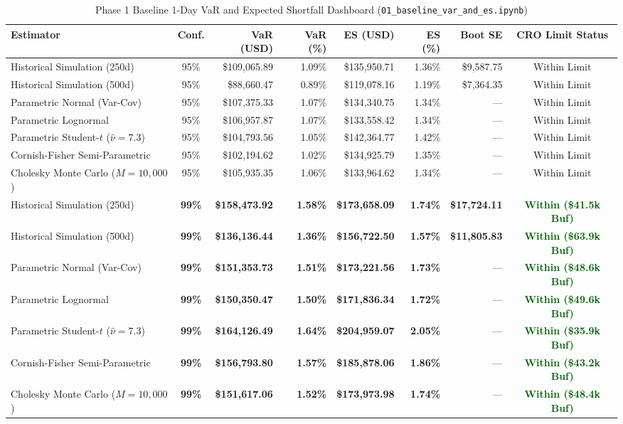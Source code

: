 \documentclass[11pt,a4paper]{article}
\begin{document}
\begin{table}[H]
\centering
\caption{Phase 1 Baseline 1-Day VaR and Expected Shortfall Dashboard (\texttt{01\_baseline\_var\_and\_es.ipynb})}
\footnotesize
\begin{tabular}{lcrrrrrc}
\toprule
\textbf{Estimator} & \textbf{Conf.} & \textbf{VaR (USD)} & \textbf{VaR (\%)} & \textbf{ES (USD)} & \textbf{ES (\%)} & \textbf{Boot SE} & \textbf{CRO Limit Status} \\
\midrule
Historical Simulation (250d) & 95\% & \$109,065.89 & 1.09\% & \$135,950.71 & 1.36\% & \$9,587.75 & Within Limit \\
Historical Simulation (500d) & 95\% & \$88,660.47 & 0.89\% & \$119,078.16 & 1.19\% & \$7,364.35 & Within Limit \\
Parametric Normal (Var-Cov) & 95\% & \$107,375.33 & 1.07\% & \$134,340.75 & 1.34\% & --- & Within Limit \\
Parametric Lognormal & 95\% & \$106,957.87 & 1.07\% & \$133,558.42 & 1.34\% & --- & Within Limit \\
Parametric Student-$t$ ($\hat{\nu}=7.3$) & 95\% & \$104,793.56 & 1.05\% & \$142,364.77 & 1.42\% & --- & Within Limit \\
Cornish-Fisher Semi-Parametric & 95\% & \$102,194.62 & 1.02\% & \$134,925.79 & 1.35\% & --- & Within Limit \\
Cholesky Monte Carlo ($M=10,000$) & 95\% & \$105,935.35 & 1.06\% & \$133,964.62 & 1.34\% & --- & Within Limit \\
\midrule
Historical Simulation (250d) & \textbf{99\%} & \textbf{\$158,473.92} & \textbf{1.58\%} & \textbf{\$173,658.09} & \textbf{1.74\%} & \textbf{\$17,724.11} & \textcolor{darkgreen}{\textbf{Within (\$41.5k Buf)}} \\
Historical Simulation (500d) & \textbf{99\%} & \textbf{\$136,136.44} & \textbf{1.36\%} & \textbf{\$156,722.50} & \textbf{1.57\%} & \textbf{\$11,805.83} & \textcolor{darkgreen}{\textbf{Within (\$63.9k Buf)}} \\
Parametric Normal (Var-Cov) & \textbf{99\%} & \textbf{\$151,353.73} & \textbf{1.51\%} & \textbf{\$173,221.56} & \textbf{1.73\%} & --- & \textcolor{darkgreen}{\textbf{Within (\$48.6k Buf)}} \\
Parametric Lognormal & \textbf{99\%} & \textbf{\$150,350.47} & \textbf{1.50\%} & \textbf{\$171,836.34} & \textbf{1.72\%} & --- & \textcolor{darkgreen}{\textbf{Within (\$49.6k Buf)}} \\
Parametric Student-$t$ ($\hat{\nu}=7.3$) & \textbf{99\%} & \textbf{\$164,126.49} & \textbf{1.64\%} & \textbf{\$204,959.07} & \textbf{2.05\%} & --- & \textcolor{darkgreen}{\textbf{Within (\$35.9k Buf)}} \\
Cornish-Fisher Semi-Parametric & \textbf{99\%} & \textbf{\$156,793.80} & \textbf{1.57\%} & \textbf{\$185,878.06} & \textbf{1.86\%} & --- & \textcolor{darkgreen}{\textbf{Within (\$43.2k Buf)}} \\
Cholesky Monte Carlo ($M=10,000$) & \textbf{99\%} & \textbf{\$151,617.06} & \textbf{1.52\%} & \textbf{\$173,973.98} & \textbf{1.74\%} & --- & \textcolor{darkgreen}{\textbf{Within (\$48.4k Buf)}} \\
\bottomrule
\end{tabular}
\end{table}
\end{document}
